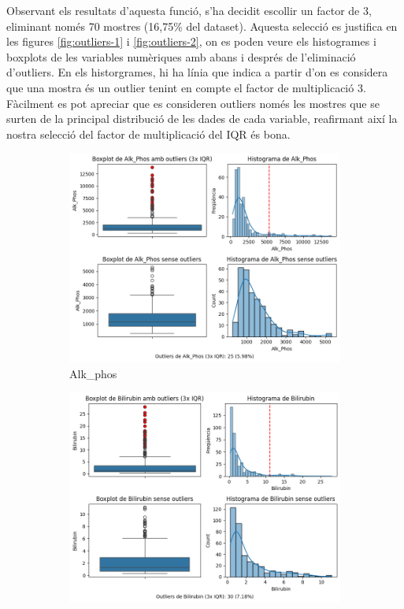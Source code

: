 Observant els resultats d'aquesta funció, s'ha decidit escollir un factor de 3, eliminant només 70 mostres (16,75\% del dataset). Aquesta selecció es justifica en les figures \ref{fig:outliers-1} i \ref{fig:outliers-2}, on es poden veure els histogrames i boxplots de les variables numèriques amb abans i després de l'eliminació d'outliers. En els historgrames, hi ha línia que indica a partir d'on es considera que una mostra és un outlier tenint en compte el factor de multiplicació 3. Fàcilment es pot apreciar que es consideren outliers només les mostres que se surten de la principal distribució de les dades de cada variable, reafirmant així la nostra selecció del factor de multiplicació del IQR és bona.

\begin{figure}[H]
\centering

\begin{subfigure}{.5\textwidth}
  \centering
  \includegraphics[width=.95\linewidth]{img/outliers_Alk_Phos.png}
  \caption{Alk\_phos}
\end{subfigure}%
\begin{subfigure}{.5\textwidth}
  \centering
  \includegraphics[width=.95\linewidth]{img/outliers_Bilirubin.png}

\end{subfigure}
\end{figure}
